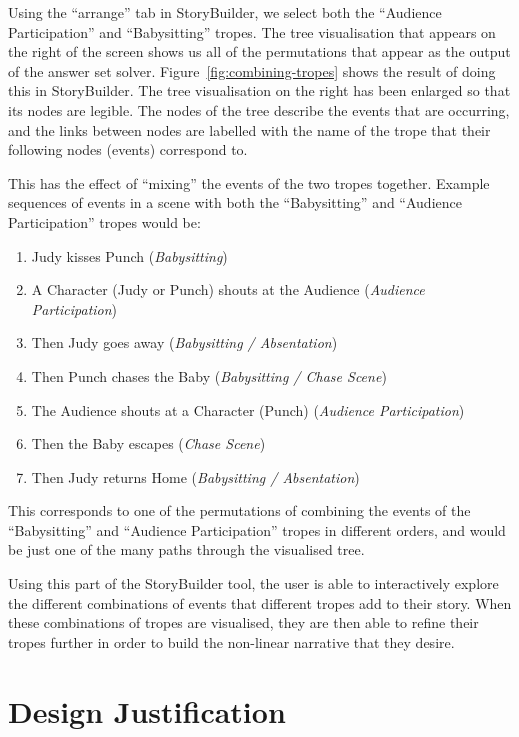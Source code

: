 \documentclass[11pt]{report}
\begin{document}
Using the ``arrange'' tab in StoryBuilder, we select both the ``Audience
Participation'' and ``Babysitting'' tropes. The tree visualisation that appears
on the right of the screen shows us all of the permutations that appear as the
output of the answer set solver. Figure~\ref{fig:combining-tropes} shows the
result of doing this in StoryBuilder. The tree visualisation on the right has
been enlarged so that its nodes are legible. The nodes of the tree describe the
events that are occurring, and the links between nodes are labelled with the
name of the trope that their following nodes (events) correspond to.

This has the effect of ``mixing'' the events of the two tropes together. Example
sequences of events in a scene with both the ``Babysitting'' and ``Audience
Participation'' tropes would be:

\begin{enumerate}
\item Judy kisses Punch (\emph{Babysitting})
\item A Character (Judy or Punch) shouts at the Audience (\emph{Audience Participation})
\item Then Judy goes away (\emph{Babysitting / Absentation})
\item Then Punch chases the Baby (\emph{Babysitting / Chase Scene})
\item The Audience shouts at a Character (Punch) (\emph{Audience Participation})
\item Then the Baby escapes (\emph{Chase Scene})
\item Then Judy returns Home (\emph{Babysitting / Absentation})
\end{enumerate}

This corresponds to one of the permutations of combining the events of the
``Babysitting'' and ``Audience Participation'' tropes in different orders, and
would be just one of the many paths through the visualised tree.


Using this part of the StoryBuilder tool, the user is able to interactively
explore the different combinations of events that different tropes add to their
story. When these combinations of tropes are visualised, they are then able to
refine their tropes further in order to build the non-linear narrative that they desire.

\section{Design Justification}
\end{document}
